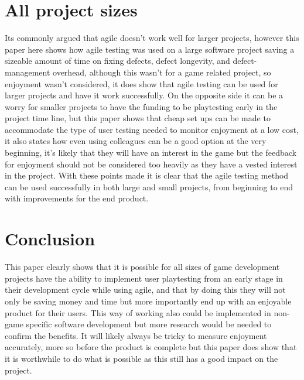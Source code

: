 \documentclass{scrartcl}
\begin{document}
	\section{All project sizes}
	Its commonly argued that agile doesn't work well for larger projects, however this paper here\cite{talby2006agile} shows how agile testing was used on a large software project saving a sizeable amount of time on fixing defects, defect longevity, and defect-management overhead, although this wasn't for a game related project, so enjoyment wasn't considered, it does show that agile testing can be used for larger projects and have it work successfully. On the opposite side it can be a worry for smaller projects to have the funding to be playtesting early in the project time line, but this paper\cite{moosajee2016games} shows that cheap set ups can be made to accommodate the type of user testing needed to monitor enjoyment at a low cost, it also states how even using colleagues can be a good option at the very beginning, it's likely that they will have an interest in the game but the feedback for enjoyment should not be considered too heavily as they have a vested interest in the project. With these points made it is clear that the agile testing method can be used successfully in both large and small projects, from beginning to end with improvements for the end product.
	
	
	\section{Conclusion}
	
	This paper clearly shows that it is possible for all sizes of game development projects have the ability to implement user playtesting from an early stage in their development cycle while using agile, and that by doing this they will not only be saving money and time but more importantly end up with an enjoyable product for their users. This way of working also could be implemented in non-game specific software development but more research would be needed to confirm the benefits. It will likely always be tricky to measure enjoyment accurately, more so before the product is complete but this paper does show that it is worthwhile to do what is possible as this still has a good impact on the project.
	
	
	
	
	
\end{document}
